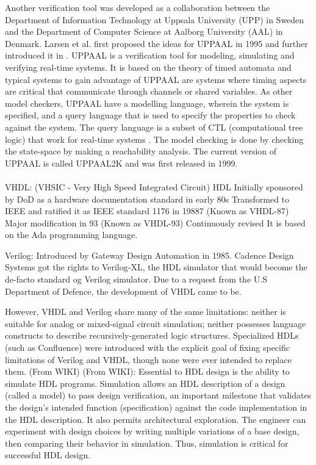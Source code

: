 \documentclass[a4paper]{report}
\begin{document}
Another verification tool was developed as a collaboration between the Department of Information Technology at Uppsala University (UPP) in Sweden and the Department of Computer Science at Aalborg University (AAL) in Denmark. Larsen et al. first proposed the ideas for UPPAAL\cite{Larsen1995} in 1995 and further introduced it in \cite{Bengtsson1995}. 
UPPAAL\cite{uppaal} is a verification tool for modeling, simulating and verifying real-time systems.
It is based on the theory of timed automata\cite{Hopcroft2001}\cite{Alur1990} and typical systems to gain advantage of UPPAAL are systems where timing aspects are critical that communicate through channels or shared variables.
As other model checkers, UPPAAL have a modelling language, wherein the system is specified, and a query language that is used to specify the properties to check against the system. The query language is a subset of CTL (computational tree logic) that work for real-time systems\cite{Henzinger1994} \cite{Larsen1995}. The model checking is done by checking the state-space by making a reachability analysis. The current version of UPPAAL is called UPPAAL2K and was first released in 1999\cite{Amnell2001}. \\\\


VHDL: (VHSIC - Very High Speed Integrated Circuit) HDL
Initially sponsored by DoD as a hardware documentation standard in early 80s
Transformed to IEEE and ratified it as IEEE standard 1176 in 19887 (Known as VHDL-87)
Major modification in 93 (Known as VHDL-93)
Continuously revised
It is based on the Ada programming language. 

Verilog: Introduced by Gateway Design Automation in 1985. Cadence Design Systems got the rights to Verilog-XL, the HDL simulator that would become the de-facto standard og Verilog simulator. Due to a request from the U.S Department of Defence, the development of VHDL came to be. 

However, VHDL and Verilog share many of the same limitations: neither is suitable for analog or mixed-signal circuit simulation; neither possesses language constructs to describe recursively-generated logic structures. Specialized HDLs (such as Confluence) were introduced with the explicit goal of fixing specific limitations of Verilog and VHDL, though none were ever intended to replace them. (From WIKI)
(From WIKI): Essential to HDL design is the ability to simulate HDL programs. Simulation allows an HDL description of a design (called a model) to pass design verification, an important milestone that validates the design's intended function (specification) against the code implementation in the HDL description. It also permits architectural exploration. The engineer can experiment with design choices by writing multiple variations of a base design, then comparing their behavior in simulation. Thus, simulation is critical for successful HDL design.
\end{document}
